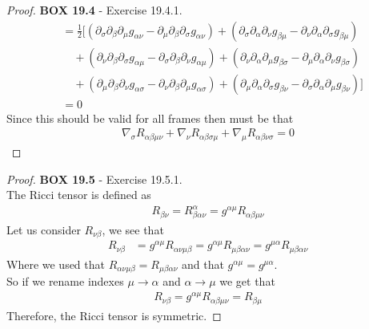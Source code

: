 \documentclass[11pt]{article}
\theoremstyle{definition}
\begin{document}
\begin{proof}{\textbf{BOX 19.4} - Exercise 19.4.1.}
\begin{align*}
    &=\frac{1}{2}[
    (\partial_{\sigma}\partial_{\beta}\partial_{\mu}g_{\alpha\nu}
    - \partial_{\mu}\partial_{\beta}\partial_{\sigma}g_{\alpha\nu})
    + (\partial_{\sigma}\partial_{\alpha}\partial_{\nu}g_{\beta\mu}
    - \partial_{\nu}\partial_{\alpha}\partial_{\sigma}g_{\beta\mu})\\
    &\quad
    + (\partial_{\nu}\partial_{\beta}\partial_{\sigma}g_{\alpha\mu}
    - \partial_{\sigma}\partial_{\beta}\partial_{\nu}g_{\alpha\mu})
    + (\partial_{\nu}\partial_{\alpha}\partial_{\mu}g_{\beta\sigma}
    - \partial_{\mu}\partial_{\alpha}\partial_{\nu}g_{\beta\sigma})\\
    &\quad
    +(\partial_{\mu}\partial_{\beta}\partial_{\nu}g_{\alpha\sigma}
    - \partial_{\nu}\partial_{\beta}\partial_{\mu}g_{\alpha\sigma})
    + (\partial_{\mu}\partial_{\alpha}\partial_{\sigma}g_{\beta\nu}
    - \partial_{\sigma}\partial_{\alpha}\partial_{\mu}g_{\beta\nu}) ]\\
    &= 0
\end{align*}
Since this should be valid for all frames then must be that
\begin{align*}
    \nabla_{\sigma} R_{\alpha\beta\mu\nu}
    + \nabla_{\nu} R_{\alpha\beta\sigma\mu} 
    + \nabla_{\mu} R_{\alpha\beta\nu\sigma} = 0
\end{align*}
\end{proof}

\cleardoublepage
\begin{proof}{\textbf{BOX 19.5} - Exercise 19.5.1.}\\
The Ricci tensor is defined as 
\begin{align*}
    R_{\beta\nu} = R^{\alpha}_{\beta\alpha\nu} = g^{\alpha\mu} R_{\alpha\beta\mu\nu}
\end{align*}
Let us consider $R_{\nu\beta}$, we see that
\begin{align*}
    R_{\nu\beta} &= g^{\alpha\mu} R_{\alpha\nu\mu\beta}
    = g^{\alpha\mu} R_{\mu\beta\alpha\nu}
    = g^{\mu\alpha} R_{\mu\beta\alpha\nu}
\end{align*}
Where we used that $R_{\alpha\nu\mu\beta} = R_{\mu\beta\alpha\nu}$ and that
$g^{\alpha\mu} = g^{\mu\alpha}$.
\\
So if we rename indexes $\mu \to \alpha$ and $\alpha \to \mu$ we get that
\begin{align*}
    R_{\nu\beta} = g^{\alpha\mu} R_{\alpha\beta\mu\nu} = R_{\beta\mu}
\end{align*}
Therefore, the Ricci tensor is symmetric.
\end{proof}
\end{document}
